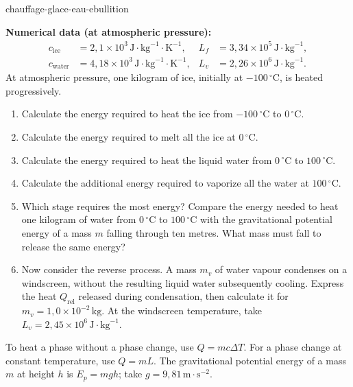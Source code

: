 
\begin{exo}{chauffage-glace-eau-ebullition}

\textbf{Numerical data (at atmospheric pressure):}
\[
\begin{aligned}
c_{\text{ice}} &= 2{,}1\times10^3\,\text{J}\!\cdot\!\text{kg}^{-1}\!\cdot\!\text{K}^{-1},
& L_f &= 3{,}34\times10^5\,\text{J}\!\cdot\!\text{kg}^{-1},\\
c_{\text{water}} &= 4{,}18\times10^3\,\text{J}\!\cdot\!\text{kg}^{-1}\!\cdot\!\text{K}^{-1},
& L_v &= 2{,}26\times10^6\,\text{J}\!\cdot\!\text{kg}^{-1}.
\end{aligned}
\]
At atmospheric pressure, one kilogram of ice, initially at $-100\,{}^\circ\text{C}$, is heated progressively.

\begin{enumerate}
  \item Calculate the energy required to heat the ice from $-100\,{}^\circ\text{C}$ to $0\,{}^\circ\text{C}$.
  \item Calculate the energy required to melt all the ice at $0\,{}^\circ\text{C}$.
  \item Calculate the energy required to heat the liquid water from $0\,{}^\circ\text{C}$ to $100\,{}^\circ\text{C}$.
  \item Calculate the additional energy required to vaporize all the water at $100\,{}^\circ\text{C}$.
  \item Which stage requires the most energy? Compare the energy needed to heat one kilogram of water from $0\,{}^\circ\text{C}$ to $100\,{}^\circ\text{C}$ with the gravitational potential energy of a mass $m$ falling through ten metres. What mass must fall to release the same energy?
  \item Now consider the reverse process. A mass $m_v$ of water vapour condenses on a windscreen, without the resulting liquid water subsequently cooling. Express the heat $Q_{\text{rel}}$ released during condensation, then calculate it for $m_v=1{,}0\times10^{-2}\,\text{kg}$. At the windscreen temperature, take $L_v=2{,}45\times10^6\,\text{J}\!\cdot\!\text{kg}^{-1}$.
\end{enumerate}

\begin{indication}
To heat a phase without a phase change, use $Q=mc\Delta T$. For a phase change at constant temperature, use $Q=mL$. The gravitational potential energy of a mass $m$ at height $h$ is $E_p=mgh$; take $g=9{,}81\,\text{m}\!\cdot\!\text{s}^{-2}$.
\end{indication}


\end{exo}
